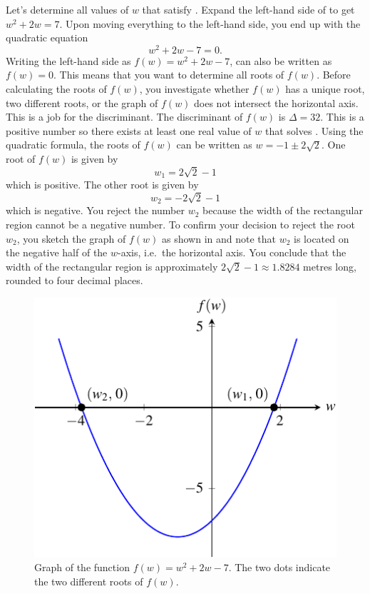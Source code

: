 \documentclass[a4paper,oneside,12pt]{article}
\begin{document}
\begin{solution}
Let's determine all values of $w$ that satisfy
.  Expand the left-hand side
of  to get $w^2 + 2w = 7$.
Upon moving everything to the left-hand side, you end up with the
quadratic equation
\begin{equation}
\label{eqn:rectangular_region_quadratic}
w^2 + 2w - 7
=
0.
\end{equation}
Writing the left-hand side as $f(w) = w^2 + 2w - 7$,
 can also be written as
$f(w) = 0$.  This means that you want to determine all roots of
$f(w)$.  Before calculating the roots of $f(w)$, you investigate
whether $f(w)$ has a unique root, two different roots, or the graph of
$f(w)$ does not intersect the horizontal axis.  This is a job for the
discriminant.  The discriminant of $f(w)$ is $\Delta = 32$.  This is a
positive number so there exists at least one real value of $w$ that
solves .  Using the
quadratic formula, the roots of $f(w)$ can be written as
$w = -1 \pm 2\sqrt{2}$.  One root of $f(w)$ is given by
\[
w_1
=
2\sqrt{2} - 1
\]
which is positive.  The other root is given by
\[
w_2
=
-2\sqrt{2} - 1
\]
which is negative.  You reject the number $w_2$ because the width of
the rectangular region cannot be a negative number.  To confirm your
decision to reject the root $w_2$, you sketch the graph of $f(w)$ as
shown in  and note that
$w_2$ is located on the negative half of the $w$-axis, i.e.~the
horizontal axis.  You conclude that the width of the rectangular
region is approximately $2\sqrt{2} - 1 \approx 1.8284$ metres long,
rounded to four decimal places.
\end{solution}

\begin{figure}[!htbp]
\centering
\includegraphics[scale=1]{image/09/a1-b2-cminus7.pdf}
\caption{%
  Graph of the function $f(w) = w^2 + 2w - 7$.  The two dots indicate
  the two different roots of $f(w)$.
}
\label{fig:rectangular_region_quadratic_roots}
\end{figure}
\end{document}
